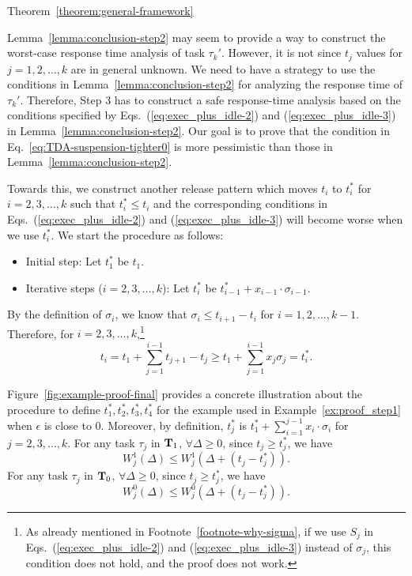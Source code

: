 \begin{appProof}{Theorem~\ref{theorem:general-framework}}


Lemma~\ref{lemma:conclusion-step2} may seem to provide a way to
construct the worst-case response time analysis of task
$\tau_k'$. However, it is not since $t_j$ values for $j=1,2,\ldots,k$
are in general unknown. We need to have a strategy to use the
conditions in Lemma~\ref{lemma:conclusion-step2} for analyzing the
response time of $\tau_k'$.
Therefore, Step 3 has to construct a safe response-time analysis based on the
conditions specified by Eqs.~(\ref{eq:exec_plus_idle-2}) and
(\ref{eq:exec_plus_idle-3}) in Lemma~\ref{lemma:conclusion-step2}. Our
goal is to prove that the condition in
Eq.~\eqref{eq:TDA-suspension-tighter0} is more pessimistic than those
in Lemma~\ref{lemma:conclusion-step2}.

Towards this, we construct another release pattern
which moves $t_i$ to $t_i^*$ for $i=2,3,\ldots,k$ such that $t_i^*
\leq t_i$ and the corresponding conditions in Eqs.~(\ref{eq:exec_plus_idle-2}) and
(\ref{eq:exec_plus_idle-3}) will become worse when we use $t_i^*$. We start
the procedure as follows:
\begin{itemize}
\item Initial step: Let $t_1^*$ be $t_1$.
\item Iterative steps ($i=2,3,\ldots,k$): Let $t_i^*$ be $t_{i-1}^*+x_{i-1}\cdot\sigma_{i-1}$.
\end{itemize}
By the definition of $\sigma_i$, we know that $\sigma_i \leq t_{i+1}-t_i$ for $i=1,2,\ldots,k-1$.
Therefore,  for $i=2,3,\ldots,k$,\footnote{As already mentioned in Footnote~\ref{footnote-why-sigma}, if we use $S_j$ in Eqs.~(\ref{eq:exec_plus_idle-2}) and
(\ref{eq:exec_plus_idle-3}) instead of $\sigma_j$, this condition does not hold, and the proof does not work.}
\begin{equation*}
  t_i = t_1 + \sum_{j=1}^{i-1} t_{j+1} - t_j \geq t_1 + \sum_{j=1}^{i-1} x_j \sigma_j = t_i^*.
\end{equation*}

Figure~\ref{fig:example-proof-final} provides a concrete illustration about the procedure to define $t_1^*, t_2^*, t_3^*, t_4^*$ for the example used in Example~\ref{ex:proof_step1} when $\epsilon$ is close to $0$.
 Moreover, by
definition, $t_j^*$ is $t_1^* + \sum_{i=1}^{j-1} x_i\cdot\sigma_i$ for
$j=2,3,\ldots,k$.
For any task $\tau_j$ in ${\bf T}_1$,  $\forall \Delta \geq 0$, since $t_j \geq t_j^*$, we have
\begin{equation}
  \label{eq:execution-case1-shifted}
  W_j^1(\Delta)  \leq W_j^1(\Delta + (t_j-t_j^*)).
\end{equation}
For any task $\tau_j$ in ${\bf T}_0$,  $\forall \Delta \geq 0$, since $t_j \geq t_j^*$, we have
\begin{equation}
  \label{eq:execution-case2-shifted}
  W_j^0(\Delta)  \leq W_j^0(\Delta + (t_j-t_j^*)).
\end{equation}


\end{appProof}
